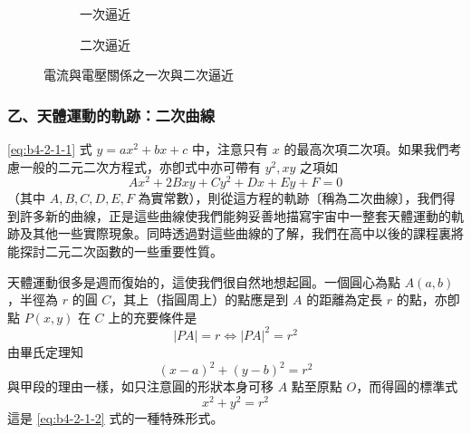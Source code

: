 \begin{figure}[H]
\centering
\begin{subfigure}[b]{0.45\textwidth}
\centering
{}
\caption{一次逼近}
\end{subfigure}
\hfill
\begin{subfigure}[b]{0.45\textwidth}
\centering
{}
\caption{二次逼近}
\end{subfigure}
\caption{電流與電壓關係之一次與二次逼近}
\label{fig:b4-2-1-4}
\end{figure}

\subsubsection*{乙、天體運動的軌跡：二次曲線}

\eqref{eq:b4-2-1-1} 式 $y = ax^2 + bx + c$ 中，注意只有 $x$ 的最高次項二次項。如果我們考慮一般的二元二次方程式，亦卽式中亦可帶有 $y^2, xy$ 之項如
\begin{equation}
Ax^2 + 2Bxy + Cy^2 + Dx + Ey + F = 0 \label{eq:b4-2-1-2}
\end{equation}
（其中 $A, B, C, D, E, F$ 為實常數），則從這方程的軌跡〔稱為二次曲線〕，我們得到許多新的曲線，正是這些曲線使我們能夠妥善地描寫宇宙中一整套天體運動的軌跡及其他一些實際現象。同時透過對這些曲線的了解，我們在高中以後的課程裏將能探討二元二次函數的一些重要性質。

天體運動很多是週而復始的，這使我們很自然地想起圓。一個圓心為點 $A(a, b)$，半徑為 $r$ 的圓 $C$，其上（指圓周上）的點應是到 $A$ 的距離為定長 $r$ 的點，亦卽點 $P(x, y)$ 在 $C$ 上的充要條件是
\[ |PA| = r \iff |PA|^2 = r^2 \]
由畢氏定理知
\begin{equation}
(x - a)^2 + (y - b)^2 = r^2 \label{eq:b4-2-1-3}
\end{equation}
與甲段的理由一樣，如只注意圓的形狀本身可移 $A$ 點至原點 $O$，而得圓的標準式
\begin{equation}
x^2 + y^2 = r^2 \label{eq:b4-2-1-4}
\end{equation}
這是 \eqref{eq:b4-2-1-2} 式的一種特殊形式。

